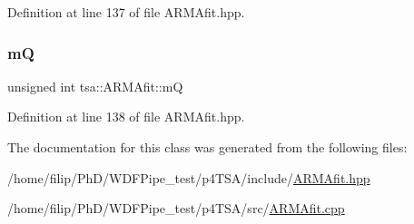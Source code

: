 Definition at line 137 of file A\+R\+M\+Afit.\+hpp.

\mbox{\label{classtsa_1_1_a_r_m_afit_abd0fb899f5347f145662e0fa53a1a0ba}} 
\subsubsection{\texorpdfstring{mQ}{mQ}}
{\footnotesize\ttfamily unsigned int tsa\+::\+A\+R\+M\+Afit\+::mQ\hspace{0.3cm}{\ttfamily [private]}}



Definition at line 138 of file A\+R\+M\+Afit.\+hpp.



The documentation for this class was generated from the following files\+:\begin{DoxyCompactItemize}
\item 
/home/filip/\+Ph\+D/\+W\+D\+F\+Pipe\+\_\+test/p4\+T\+S\+A/include/\hyperlink{_a_r_m_afit_8hpp}{A\+R\+M\+Afit.\+hpp}\item 
/home/filip/\+Ph\+D/\+W\+D\+F\+Pipe\+\_\+test/p4\+T\+S\+A/src/\hyperlink{_a_r_m_afit_8cpp}{A\+R\+M\+Afit.\+cpp}\end{DoxyCompactItemize}
